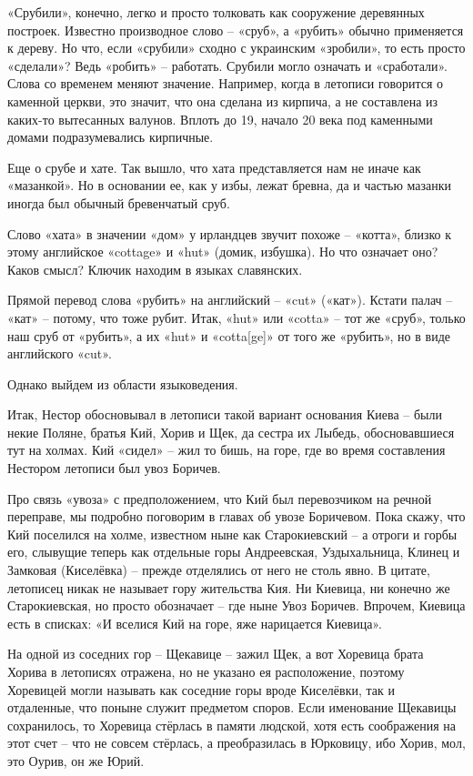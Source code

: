 «Срубили», конечно, легко и просто толковать как сооружение деревянных построек. Известно производное слово – «сруб», а «рубить» обычно применяется к дереву. Но что, если «срубили» сходно с украинским «зробили», то есть просто «сделали»? Ведь «робить» – работать. Срубили могло означать и «сработали». Слова со временем меняют значение. Например, когда в летописи говорится о каменной церкви, это значит, что она сделана из кирпича, а не составлена из каких-то вытесанных валунов. Вплоть до 19, начало 20 века под каменными домами подразумевались кирпичные.

Еще о срубе и хате. Так вышло, что хата представляется нам не иначе как «мазанкой». Но в основании ее, как у избы, лежат бревна, да и частью мазанки иногда был обычный бревенчатый сруб.

Слово «хата» в значении «дом» у ирландцев звучит похоже – «котта», близко к этому английское «cottage» и «hut» (домик, избушка). Но что означает оно? Каков смысл? Ключик находим в языках славянских.

Прямой перевод слова «рубить» на английский – «cut» («кат»). Кстати палач – «кат» – потому, что тоже рубит. Итак, «hut» или «cotta» – тот же «сруб», только наш сруб от «рубить», а их «hut» и «cotta[ge]» от того же «рубить», но в виде английского «cut».

Однако выйдем из области языковедения.

Итак, Нестор обосновывал в летописи такой вариант основания Киева – были некие Поляне, братья Кий, Хорив и Щек, да сестра их Лыбедь, обосновавшиеся тут на холмах. Кий «сидел» – жил то бишь, на горе, где во время составления Нестором летописи был увоз Боричев.

Про связь «увоза» с предположением, что Кий был перевозчиком на речной переправе, мы подробно поговорим в главах об увозе Боричевом. Пока скажу, что Кий поселился на холме, известном ныне как Старокиевский – а отроги и горбы его, слывущие теперь как отдельные горы Андреевская, Уздыхальница, Клинец и Замковая (Киселёвка) – прежде отделялись от него не столь явно. В цитате, летописец никак не называет гору жительства Кия. Ни Киевица, ни конечно же Старокиевская, но просто обозначает – где ныне Увоз Боричев. Впрочем, Киевица есть в списках: «И вселися Кий на горе, яже нарицается Киевица». 

На одной из соседних гор – Щекавице – зажил Щек, а вот Хоревица брата Хорива в летописях отражена, но не указано ея расположение, поэтому Хоревицей могли называть как соседние горы вроде Киселёвки, так и отдаленные, что поныне служит предметом споров. Если именование Щекавицы сохранилось, то Хоревица стёрлась в памяти людской, хотя есть соображения на этот счет – что не совсем стёрлась, а преобразилась в Юрковицу, ибо Хорив, мол, это Оурив, он же Юрий.

